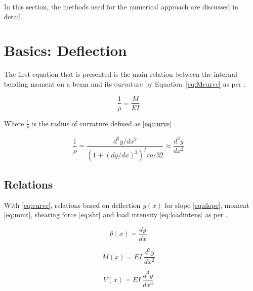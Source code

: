 \label{chapt:prelim}

In this section, the methods used for the numerical approach are discussed in detail.

\section{Basics: Deflection}

The first equation that is presented is the main relation between the internal bending moment on a beam and its curvature by Equation~\ref{eq:Mcurve} as per \citep{nisbett2014shigley}. 

\begin{equation}
	\label{eq:Mcurve}
	\frac{1}{\rho}=\frac{M}{EI}
\end{equation}

Where $\frac{1}{\rho}$ is the radius of curvature defined as \ref{eq:curve}

\begin{equation}
	\label{eq:curve}
	\frac{1}{\rho}=\frac{d^2y/dx^2}{\left( 1 +(dy/dx)^2 \right)^frac{3}{2}} \approx \frac{d^2y}{dx^2}
\end{equation}

\subsection{Relations}

With \ref{eq:curve}, relations based on deflection $y(x)$ for slope \ref{eq:slope}, moment \ref{eq:mmt}, shearing force \ref{eq:shr} and load intensity \ref{eq:loadintens} as per \citep{nisbett2014shigley}.

\begin{equation}
	\label{eq:slope}
	\theta(x) = \frac{dy}{dx}
\end{equation}

\begin{equation}
	\label{eq:mmt}
	M(x) = EI\ \frac{d^2y}{dx^2}
\end{equation}

\begin{equation}
	\label{eq:shr}
	V(x) = EI\ \frac{d^3y}{dx^3}
\end{equation}

